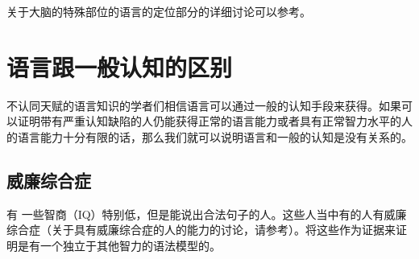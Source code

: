 关于大脑的特殊部位的语言的定位部分的详细讨论可以参考。


\section{语言跟一般认知的区别}

不认同天赋的语言知识的学者们相信语言可以通过一般的认知手段来获得。如果可以证明带有严重认知缺陷的人仍能获得正常的语言能力或者具有正常智力水平的人的语言能力十分有限的话，那么我们就可以说明语言和一般的认知是没有关系的。

\subsection{威廉综合症}

\largerpage[2]
有 一些智商（IQ）特别低，但是能说出合法句子的人。这些人当中有的人有威廉综合症（关于具有威廉综合症的人的能力的讨论，请参考）。\citet{Yamada81a}将这些作为证据来证明是有一个独立于其他智力的语法模型的。

